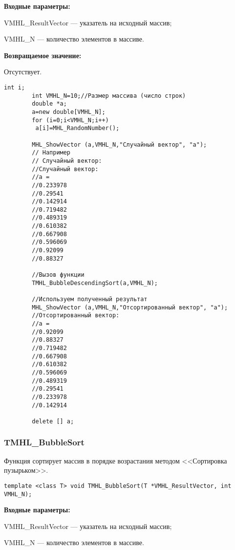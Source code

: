 \documentclass[a4paper,12pt]{article}
\begin{document}
\textbf{Входные параметры:}
 
VMHL\_ResultVector --- указатель на исходный массив;
 
VMHL\_N --- количество элементов в массиве.

\textbf{Возвращаемое значение:}

Отсутствует.


\begin{lstlisting}[label=code_use_TMHL_BubbleDescendingSort,caption=Пример использования]
        int i;
        int VMHL_N=10;//Размер массива (число строк)
        double *a;
        a=new double[VMHL_N];
        for (i=0;i<VMHL_N;i++)
         a[i]=MHL_RandomNumber();

        MHL_ShowVector (a,VMHL_N,"Случайный вектор", "a");
        // Например
        // Случайный вектор:
        //Случайный вектор:
        //a =
        //0.233978
        //0.29541
        //0.142914
        //0.719482
        //0.489319
        //0.610382
        //0.667908
        //0.596069
        //0.92099
        //0.88327

        //Вызов функции
        TMHL_BubbleDescendingSort(a,VMHL_N);

        //Используем полученный результат
        MHL_ShowVector (a,VMHL_N,"Отсортированный вектор", "a");
        //Отсортированный вектор:
        //a =
        //0.92099
        //0.88327
        //0.719482
        //0.667908
        //0.610382
        //0.596069
        //0.489319
        //0.29541
        //0.233978
        //0.142914

        delete [] a;
\end{lstlisting}

\subsubsection{TMHL\_BubbleSort}\label{TMHL_BubbleSort}

Функция сортирует массив в порядке возрастания методом <<Сортировка пузырьком>>.


\begin{lstlisting}[label=code_syntax_TMHL_BubbleSort,caption=Синтаксис]
template <class T> void TMHL_BubbleSort(T *VMHL_ResultVector, int VMHL_N);
\end{lstlisting}

\textbf{Входные параметры:}
 
VMHL\_ResultVector --- указатель на исходный массив;
 
VMHL\_N --- количество элементов в массиве.
\end{document}
